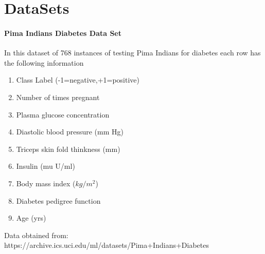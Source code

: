 \documentclass[12pt]{article}
\begin{document}
\newpage
\section*{DataSets}
\paragraph{Pima Indians Diabetes Data Set} 
In this dataset of 768 instances of testing Pima Indians for diabetes each row has the following information
\begin{enumerate}
\item Class Label (-1=negative,+1=positive)
\item Number of times pregnant
\item Plasma glucose concentration
\item Diastolic blood pressure (mm Hg)
\item Triceps skin fold thinkness (mm)
\item Insulin (mu U/ml)
\item Body mass index ($kg/m^2$)
\item Diabetes pedigree function
\item Age (yrs)
\end{enumerate}
Data obtained from:  https://archive.ics.uci.edu/ml/datasets/Pima+Indians+Diabetes

\newpage
\end{document}
